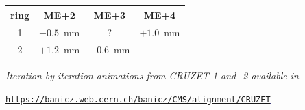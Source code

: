 \documentclass[compress]{beamer}
\begin{document}
\begin{frame}
\begin{center}
\vspace{0.03 cm}
\renewcommand{\arraystretch}{1.2}
\begin{tabular}{c | c c c}
ring & ME+2 & ME+3 & ME+4 \\\hline
1 & $-0.5$~mm & ? & $+1.0$~mm \\
2 & $+1.2$~mm & $-0.6$~mm & \\
\end{tabular}
\end{center}

\vspace{0.05 cm} \scriptsize
{\it Iteration-by-iteration animations from CRUZET-1 and -2 available in}

\textcolor{blue}{\tt \underline{\href{https://banicz.web.cern.ch/banicz/CMS/alignment/CRUZET}{https://banicz.web.cern.ch/banicz/CMS/alignment/CRUZET}}}

\end{frame}
\end{document}
